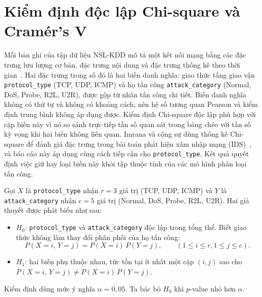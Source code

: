 \section{Kiểm định độc lập Chi-square và Cramér’s V}
\label{subsec:chi2-theory}

Mỗi bản ghi của tập dữ liệu NSL-KDD mô tả một kết nối mạng bằng các đặc trưng lưu lượng cơ bản, đặc trưng nội dung và đặc trưng thống kê theo thời gian~\cite{task2_kdd1999}. Hai đặc trưng trong số đó là hai biến danh nghĩa: giao thức tầng giao vận \texttt{protocol\_type} (TCP, UDP, ICMP) và họ tấn công \texttt{attack\_category} (Normal, DoS, Probe, R2L, U2R), được gộp từ nhãn tấn công chi tiết. Biến danh nghĩa không có thứ tự và không có khoảng cách, nên hệ số tương quan Pearson và kiểm định trung bình không áp dụng được. Kiểm định Chi-square độc lập phù hợp với cặp biến này vì nó so sánh trực tiếp tần số quan sát trong bảng chéo với tần số kỳ vọng khi hai biến không liên quan. Imrana và cộng sự dùng thống kê Chi-square để đánh giá đặc trưng trong bài toán phát hiện xâm nhập mạng (IDS)~\cite{task2_imrana2022}, và báo cáo này áp dụng cùng cách tiếp cận cho \texttt{protocol\_type}. Kết quả quyết định việc giữ hay loại biến này khỏi tập thuộc tính của các mô hình phân loại tấn công.

Gọi $X$ là \texttt{protocol\_type} nhận $r = 3$ giá trị (TCP, UDP, ICMP) và $Y$ là \texttt{attack\_\allowbreak{}category} nhận $c = 5$ giá trị (Normal, DoS, Probe, R2L, U2R). Hai giả thuyết được phát biểu như sau:
\begin{itemize}
  \item $H_0$: \texttt{protocol\_type} và \texttt{attack\_category} độc lập trong tổng thể. Biết giao thức không làm thay đổi phân phối của họ tấn công:
    \begin{equation}
      \label{eq:t34:independence}
      P(X = i,\, Y = j) = P(X = i)\,P(Y = j), \qquad (1\le i \le r, 1\le j \le c).
    \end{equation}
  \item $H_1$: hai biến phụ thuộc nhau, tức tồn tại ít nhất một cặp $(i, j)$ sao cho $P(X = i,\, Y = j) \neq P(X = i)\,P(Y = j)$.
\end{itemize}
Kiểm định dùng mức ý nghĩa $\alpha = 0{,}05$. Ta bác bỏ $H_0$ khi $p$-value nhỏ hơn $\alpha$.

